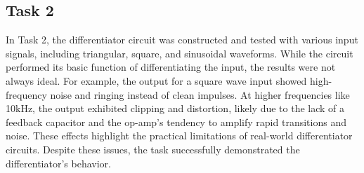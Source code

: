 \documentclass{article}
\begin{document}
\subsection{Task 2}
In Task 2, the differentiator circuit was constructed and tested with various input signals, including triangular, square, and sinusoidal waveforms. While the circuit performed its basic function of differentiating the input, the results were not always ideal. For example, the output for a square wave input showed high-frequency noise and ringing instead of clean impulses. At higher frequencies like 10kHz, the output exhibited clipping and distortion, likely due to the lack of a feedback capacitor and the op-amp’s tendency to amplify rapid transitions and noise. These effects highlight the practical limitations of real-world differentiator circuits. Despite these issues, the task successfully demonstrated the differentiator’s behavior.
\end{document}
